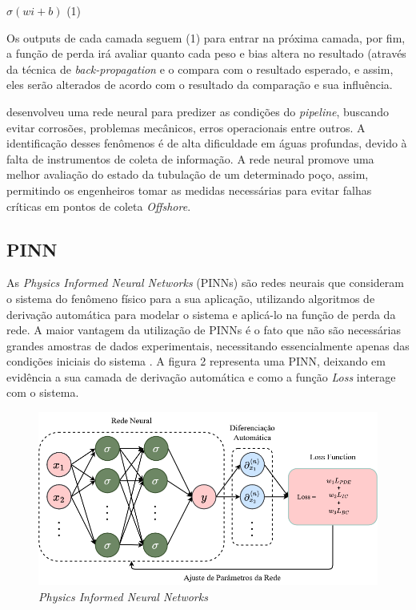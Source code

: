 \documentclass{article}[12pt, openright, oneside, a4paper, portuguese]
\begin{document}
    \begin{center}
        $ \sigma(wi + b)$ (1)
    \end{center}

    Os outputs de cada camada seguem (1) para entrar na próxima camada, por fim, a função de perda irá avaliar quanto cada peso e bias altera no resultado (através da técnica de \textit{back-propagation} e o compara com o resultado esperado, e assim, eles serão alterados de acordo com o resultado da comparação e sua influência.

     desenvolveu uma rede neural para predizer as condições do \textit{pipeline}, buscando evitar corrosões, problemas mecânicos, erros operacionais entre outros. A identificação desses fenômenos é de alta dificuldade em águas profundas, devido à falta de instrumentos de coleta de informação. A rede neural promove uma melhor avaliação do estado da tubulação de um determinado poço, assim, permitindo os engenheiros tomar as medidas necessárias para evitar falhas críticas em pontos de coleta \textit{Offshore}.

    \subsection{PINN}
    
    As \textit{Physics Informed Neural Networks} (PINNs) são redes neurais que consideram o sistema do fenômeno físico para a sua aplicação, utilizando algoritmos de derivação automática para modelar o sistema e aplicá-lo na função de perda da rede. A maior vantagem da utilização de PINNs é o fato que não são necessárias grandes amostras de dados experimentais, necessitando essencialmente apenas das condições iniciais do sistema \cite{Blechschmidt2021}. A figura 2 representa uma PINN, deixando em evidência a sua camada de derivação automática e como a função \textit{Loss} interage com o sistema.
    
    \begin{figure}[H]
       \centering
        \includegraphics[width=0.75\linewidth]{src/Imagens/PINN DIAGRAMA.drawio.png}
        \caption{\textit{Physics Informed Neural Networks}}
    \end{figure}
\end{document}
